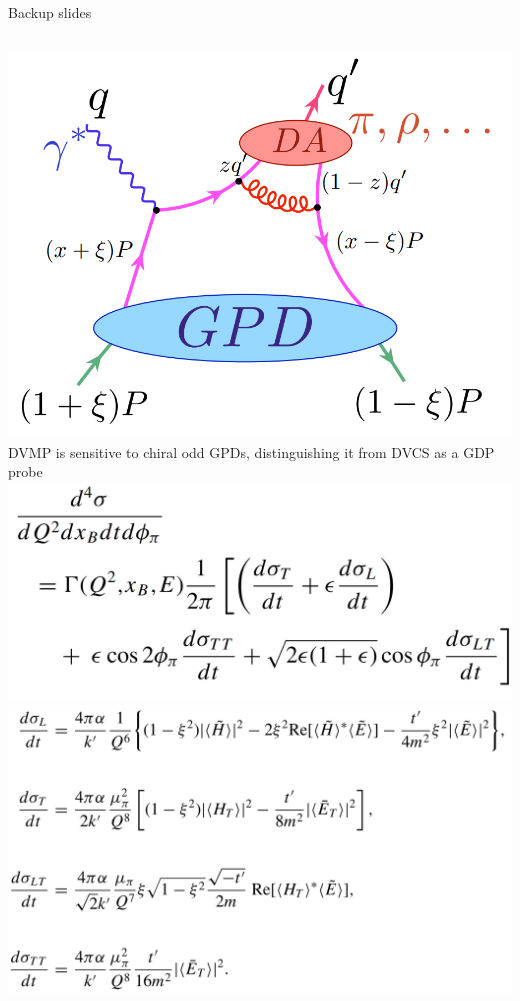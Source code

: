 \documentclass[aspectratio=169]{beamer}
\begin{document}
\begin{frame}{Backup slides}

   \begin{columns}
            \includegraphics[scale=0.2]{Pics/currentWork/dvpipdiagram.png}\\
            DVMP is sensitive to chiral odd GPDs, distinguishing it from DVCS as a GDP probe\\
            
            \includegraphics[scale=0.14]{Pics/currentWork/cross-section-formula.png}\\
            \includegraphics[scale=0.085]{Pics/currentWork/gpds.png}\\
            
    \end{columns}
    
\end{frame}
\end{document}
